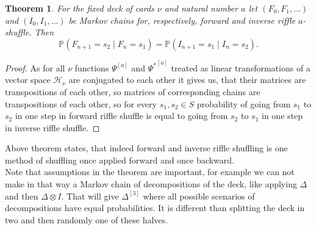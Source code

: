 \documentclass[a4paper, 12pt]{article}
\newtheorem{theorem}{Theorem}
\begin{document}
\begin{theorem}
For the fixed deck of cards $\nu$ and natural number $a$
let $(F_0, F_1, \dots)$ and $(I_0, I_1, \dots)$ be Markov chains for, respectively,
forward and inverse riffle $a$-shuffle. Then
\begin{equation*}
\mathbb{P}(F_{n+1} = s_2 \mid F_n = s_1) = \mathbb{P}(I_{n+1} = s_1 \mid I_n = s_2).
\end{equation*}
\end{theorem}
\begin{proof}
    As for all $\nu$ functions $\Psi^{[a]}$ and ${\Psi^*}^{[a]}$ treated as linear transformations of
    a vector space $\mathcal{H}_\nu$ are conjugated to each other
    it gives us, that their matrices are transpositions of each other, so matrices of corresponding chains
    are transpositions of each other, so for every $s_1, s_2 \in S$ probability of going from $s_1$ to $s_2$
    in one step in forward riffle shuffle is equal to going from $s_2$ to $s_1$ in one step in inverse riffle
    shuffle.
\end{proof}
Above theorem states, that indeed forward and inverse riffle shuffling is one method of shuffling
once applied forward and once backward. \\[8pt]
Note that assumptions in the theorem are important, for example we can not make in that  way  a Markov chain
of decompositions of the deck, like applying $\Delta$ and then $\Delta \otimes I$. That will give
$\Delta^{[3]}$ where all possible scenarios of decompositions have equal probabilities.
It is different than splitting the deck in two and then randomly one of these halves.
\end{document}
